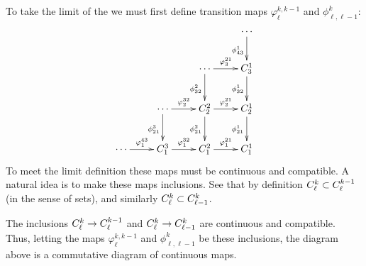       To take the limit of the \Ckl we must first define transition maps $\varphi^{k,k-1}_\ell$ and $\phi^k_{\ell,\ell-1}$:
      \begin{displaymath}
        \xymatrix{
          &&& \cdots \ar[d]_{\phi^1_{43}}\\
          && \cdots \ar[d]_{\phi^2_{32}} \ar[r]^{\varphi^{21}_3} & C^1_3 \ar[d]_{\phi^1_{32}}\\
          & \cdots \ar[d]_{\phi^3_{21}} \ar[r]^{\varphi^{32}_2} & C^2_2 \ar[d]_{\phi^2_{21}} \ar[r]^{\varphi^{21}_2} & C^1_2 \ar[d]_{\phi^1_{21}}\\
          \cdots \ar[r]^{\varphi^{43}_1} & C^3_1 \ar[r]^{\varphi^{32}_1} & C^2_1 \ar[r]^{\varphi^{21}_1} & C^1_1
        }
      \end{displaymath}
      To meet the limit definition these maps must be continuous and compatible.
      A natural idea is to make these maps inclusions.
      See that by definition ${C^k_\ell}\subset{C^{k-1}_\ell}$ (in the sense of sets), and similarly ${C^k_\ell}\subset C^k_{\ell-1}$.
      \begin{claim}
        \label{claim:inclcont}
        The inclusions ${C^k_\ell}\rightarrow {C^{k-1}_\ell}$ and ${C^k_\ell}\rightarrow C^k_{\ell-1}$ are continuous and compatible.
        Thus, letting the maps $\varphi^{k,k-1}_\ell$ and $\phi^k_{\ell,\ell-1}$ be these inclusions, the diagram above is a commutative diagram of continuous maps.
      \end{claim}
